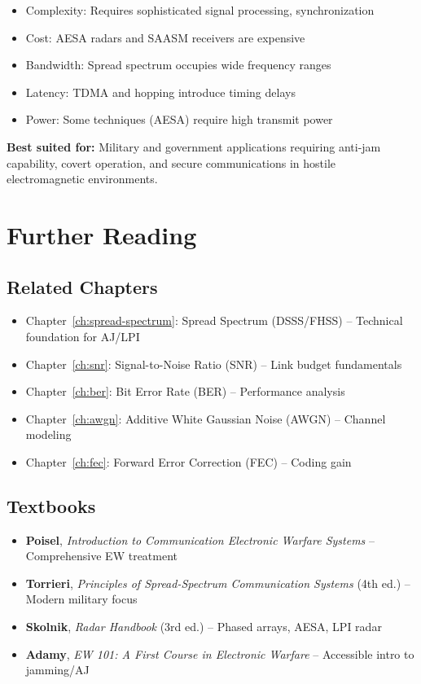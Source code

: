 \begin{itemize}
\item Complexity: Requires sophisticated signal processing, synchronization
\item Cost: AESA radars and SAASM receivers are expensive
\item Bandwidth: Spread spectrum occupies wide frequency ranges
\item Latency: TDMA and hopping introduce timing delays
\item Power: Some techniques (AESA) require high transmit power
\end{itemize}

\textbf{Best suited for:} Military and government applications requiring anti-jam capability, covert operation, and secure communications in hostile electromagnetic environments.

\section{Further Reading}

\subsection{Related Chapters}

\begin{itemize}
\item Chapter~\ref{ch:spread-spectrum}: Spread Spectrum (DSSS/FHSS) -- Technical foundation for AJ/LPI
\item Chapter~\ref{ch:snr}: Signal-to-Noise Ratio (SNR) -- Link budget fundamentals
\item Chapter~\ref{ch:ber}: Bit Error Rate (BER) -- Performance analysis
\item Chapter~\ref{ch:awgn}: Additive White Gaussian Noise (AWGN) -- Channel modeling
\item Chapter~\ref{ch:fec}: Forward Error Correction (FEC) -- Coding gain
\end{itemize}

\subsection{Textbooks}

\begin{itemize}
\item \textbf{Poisel}, \emph{Introduction to Communication Electronic Warfare Systems} -- Comprehensive EW treatment
\item \textbf{Torrieri}, \emph{Principles of Spread-Spectrum Communication Systems} (4th ed.) -- Modern military focus
\item \textbf{Skolnik}, \emph{Radar Handbook} (3rd ed.) -- Phased arrays, AESA, LPI radar
\item \textbf{Adamy}, \emph{EW 101: A First Course in Electronic Warfare} -- Accessible intro to jamming/AJ
\end{itemize}

